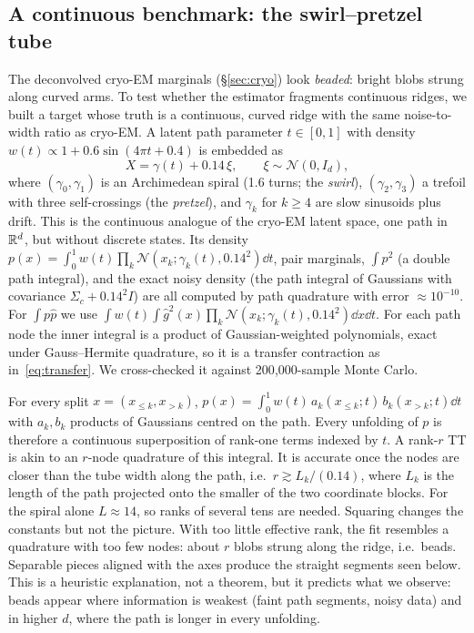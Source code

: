 \subsection{A continuous benchmark: the swirl--pretzel tube}
\label{sec:swirl}
The deconvolved cryo-EM marginals (\S\ref{sec:cryo}) look \emph{beaded}: bright blobs strung along curved arms. To test whether the
estimator fragments continuous ridges, we built a target whose truth is a continuous, curved ridge with the same
noise-to-width ratio as cryo-EM. A latent path parameter $t\in[0,1]$ with density $w(t)\propto 1+0.6\sin(4\pi t+0.4)$
is embedded as
\[
  X=\gamma(t)+0.14\,\xi,\qquad \xi\sim\mathcal N(0,I_d),
\]
where $(\gamma_0,\gamma_1)$ is an Archimedean spiral (1.6 turns; the \emph{swirl}), $(\gamma_2,\gamma_3)$ a trefoil with
three self-crossings (the \emph{pretzel}), and $\gamma_k$ for $k\ge4$ are slow sinusoids plus drift. This is the continuous
analogue of the cryo-EM latent space, one path in $\mathbb{R}^d$, but without discrete states. Its density
$p(x)=\int_0^1w(t)\prod_k\mathcal N(x_k;\gamma_k(t),0.14^2)\dd t$, pair marginals, $\int p^2$ (a double path
integral), and the exact noisy density (the path integral of Gaussians with covariance $\Sigma_c+0.14^2I$) are all
computed by path quadrature with error $\approx10^{-10}$. For $\int p\hat p$ we use
$\int w(t)\int\hat g^2(x)\prod_k\mathcal N(x_k;\gamma_k(t),0.14^2)\dd x\dd t$. For each path node the inner integral
is a product of Gaussian-weighted polynomials, exact under Gauss--Hermite quadrature, so it is a transfer
contraction as in~\eqref{eq:transfer}. We cross-checked it against 200{,}000-sample Monte Carlo.

\begin{remark}
For every split $x=(x_{\le k},x_{>k})$,
$p(x)=\int_0^1 w(t)\,a_k(x_{\le k};t)\,b_k(x_{>k};t)\dd t$ with $a_k,b_k$ products of Gaussians centred on the path.
Every unfolding of $p$ is therefore a continuous superposition of rank-one terms indexed by $t$. A rank-$r$ TT is
akin to an $r$-node quadrature of this integral. It is accurate once the nodes are closer than the tube width
along the path, i.e.\ $r\gtrsim L_k/(0.14)$, where $L_k$ is the length of the path projected onto the smaller of the two
coordinate blocks. For the spiral alone $L\approx14$, so ranks of several tens are needed. Squaring changes the
constants but not the picture. With too little effective rank, the fit resembles a quadrature with too few
nodes: about $r$ blobs strung along the ridge, i.e.\ beads. Separable pieces aligned with the axes produce the
straight segments seen below. This is a heuristic explanation, not a theorem, but it predicts what we observe: beads
appear where information is weakest (faint path segments, noisy data) and in higher $d$, where the path is longer
in every unfolding.
\end{remark}

